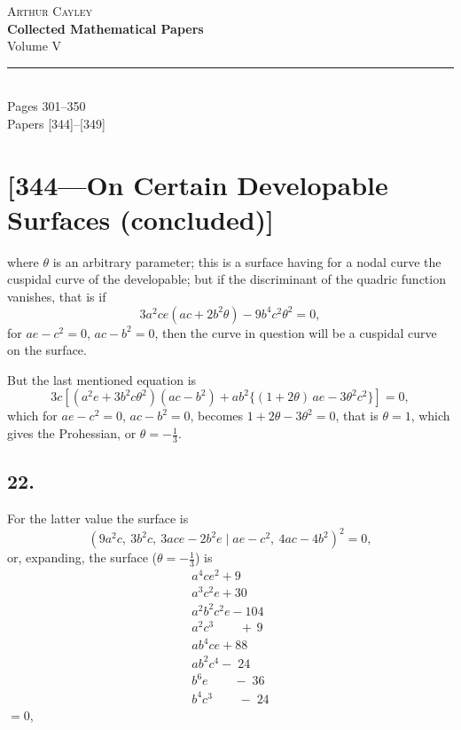 \documentclass[11pt,a4paper]{article}
\theoremstyle{definition}
\begin{document}
\begin{center}
{\Large\scshape Arthur Cayley}\\[6pt]
{\LARGE\bfseries Collected Mathematical Papers}\\[4pt]
{\large Volume V}\\[12pt]
\rule{0.6\textwidth}{0.4pt}\\[12pt]
{\large Pages 301--350}\\[6pt]
{\small Papers [344]--[349]}
\end{center}

\vspace{1em}

\section*{[344---On Certain Developable Surfaces (concluded)]}

\noindent
where $\theta$ is an arbitrary parameter; this is a surface having for a nodal curve the
cuspidal curve of the developable; but if the discriminant of the quadric function
vanishes, that is if
\[
3a^{2}ce(ac + 2b^{2}\theta) - 9b^{4}c^{2}\theta^{2} = 0,
\]
for $ae - c^{2} = 0$, $ac - b^{2} = 0$, then the curve in question will be a cuspidal curve on the
surface.

But the last mentioned equation is
\[
3c\left[(a^{2}e + 3b^{2}c\theta^{2})(ac - b^{2}) + ab^{2}\{(1 + 2\theta)\,ae - 3\theta^{2}c^{2}\}\right] = 0,
\]
which for $ae - c^{2} = 0$, $ac - b^{2} = 0$, becomes $1 + 2\theta - 3\theta^{2} = 0$, that is $\theta = 1$, which gives the
Prohessian, or $\theta = -\frac{1}{3}$.

\subsection*{22.}

For the latter value the surface is
\[
(9a^{2}c,\ 3b^{2}c,\ 3ace - 2b^{2}e \mid ae - c^{2},\ 4ac - 4b^{2})^{2} = 0,
\]
or, expanding, the surface ($\theta = -\frac{1}{3}$) is
\begin{gather*}
a^{4}ce^{2} + 9\\
a^{3}c^{2}e + 30\\
a^{2}b^{2}c^{2}e - 104\\
a^{2}c^{3} \phantom{+}\;\;\; +\, 9\\
ab^{4}ce + 88\\
ab^{2}c^{4} -\; 24\\
b^{6}e \phantom{+}\;\;\; -\; 36\\
b^{4}c^{3} \phantom{+}\;\;\; -\; 24
\end{gather*}
$= 0$,
\end{document}
